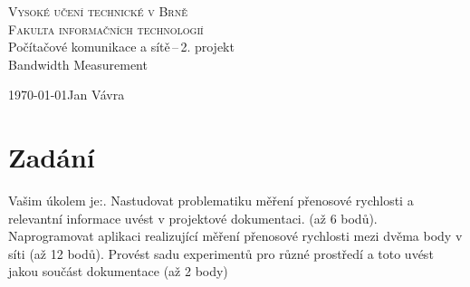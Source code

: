 \documentclass[11pt] {article}
\begin{document}
\begin{titlepage}
\begin{center}
\Huge
\textsc{Vysoké učení technické v Brně\\ \vspace{-2mm}
\huge Fakulta informačních technologií} \\
\LARGE \hspace{-4mm} Počítačové komunikace a sítě\,--\,2. projekt\\[-0.85mm]
\Huge \hspace{0.25mm}  Bandwidth Measurement
\end{center}
{\Large \today \hfill Jan Vávra}
\end{titlepage}

\tableofcontents
\newpage

\section{Zadání}
Vašim úkolem je:. Nastudovat problematiku měření přenosové rychlosti a relevantní informace uvést v projektové dokumentaci. (až 6 bodů). Naprogramovat aplikaci realizující měření přenosové rychlosti mezi dvěma body v síti (až 12 bodů). Provést sadu experimentů pro různé prostředí a toto uvést jakou součást dokumentace (až 2 body)
\end{document}
